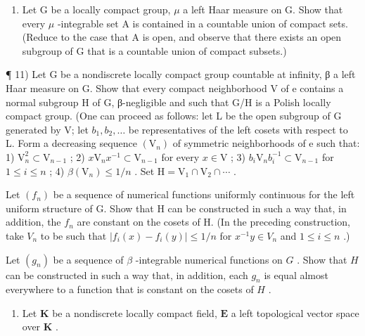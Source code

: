 \begin{enumerate}
\item
  Let G be a locally compact group, \(\mu\) a left Haar measure on G. Show that every \(\mu\) -integrable set A is contained in a countable union of compact sets. (Reduce to the case that A is open, and observe that there exists an open subgroup of G that is a countable union of compact subsets.)
\end{enumerate}

¶ 11) Let G be a nondiscrete locally compact group countable at infinity, β a left Haar measure on G. Show that every compact neighborhood V of e contains a normal subgroup H of G, β-negligible and such that G/H is a Polish locally compact group. (One can proceed as follows: let L be the open subgroup of G generated by V; let \(b_{1}, b_{2}, \ldots\) be representatives of the left cosets with respect to L. Form a decreasing sequence \((\mathrm{V}_{n})\) of symmetric neighborhoods of e such that: 1) \(\mathrm{V}_{n}^{2} \subset \mathrm{V}_{n-1}\) ; 2) \(x\mathrm{V}_{n}x^{-1} \subset \mathrm{V}_{n-1}\) for every \(x \in \mathrm{V}\) ; 3) \(b_{i}\mathrm{V}_{n}b_{i}^{-1} \subset \mathrm{V}_{n-1}\) for \(1 \leqslant i \leqslant n\) ; 4) \(\beta(\mathrm{V}_{n}) \leqslant 1/n\) . Set \(\mathrm{H} = \mathrm{V}_{1} \cap \mathrm{V}_{2} \cap \cdots\) .

Let \((f_{n})\) be a sequence of numerical functions uniformly continuous for the left uniform structure of G. Show that H can be constructed in such a way that, in addition, the \(f_{n}\) are constant on the cosets of H. (In the preceding construction, take \(V_{n}\) to be such that \(|f_{i}(x) - f_{i}(y)| \leqslant 1/n\) for \(x^{-1}y \in V_{n}\) and \(1 \leqslant i \leqslant n\) .)

Let \((g_n)\) be a sequence of \(\beta\) -integrable numerical functions on \(G\) . Show that \(H\) can be constructed in such a way that, in addition, each \(g_n\) is equal almost everywhere to a function that is constant on the cosets of \(H\) .

\begin{enumerate}
\def\labelenumi{\arabic{enumi})}
\setcounter{enumi}{11}
\tightlist
\item
  Let \(\mathbf{K}\) be a nondiscrete locally compact field, \(\mathbf{E}\) a left topological vector space over \(\mathbf{K}\) .
\end{enumerate}

